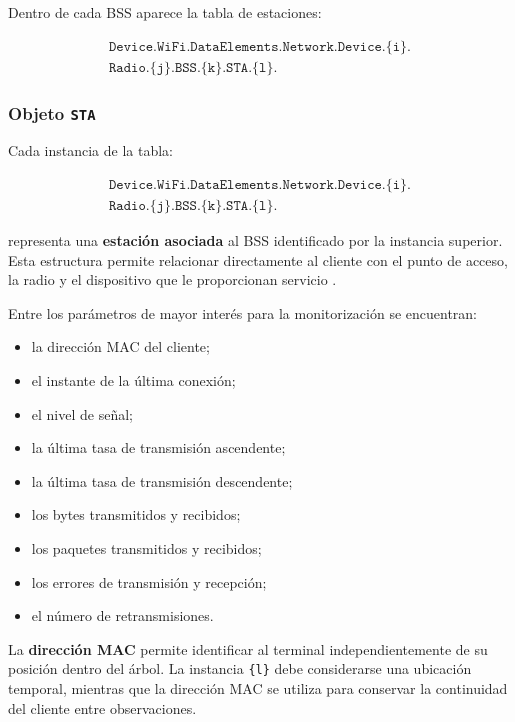 Dentro de cada BSS aparece la tabla de estaciones:

\[
\begin{split}
    \texttt{Device.WiFi.DataElements.Network.Device.\{i\}.}\\
    \texttt{Radio.\{j\}.BSS.\{k\}.STA.\{l\}.}
\end{split}
\]


\subsubsection*{Objeto \texttt{STA}}

Cada instancia de la tabla:

\[
\begin{split}
    \texttt{Device.WiFi.DataElements.Network.Device.\{i\}.}\\
    \texttt{Radio.\{j\}.BSS.\{k\}.STA.\{l\}.}
\end{split}
\]

representa una \textbf{estación asociada} al BSS identificado por la
instancia superior. Esta estructura permite relacionar directamente al
cliente con el punto de acceso, la radio y el dispositivo que le
proporcionan servicio \cite{bbf_tr181}.

Entre los parámetros de mayor interés para la monitorización se
encuentran:

\begin{itemize}
    \item la dirección MAC del cliente;
    \item el instante de la última conexión;
    \item el nivel de señal;
    \item la última tasa de transmisión ascendente;
    \item la última tasa de transmisión descendente;
    \item los bytes transmitidos y recibidos;
    \item los paquetes transmitidos y recibidos;
    \item los errores de transmisión y recepción;
    \item el número de retransmisiones.
\end{itemize}

La \textbf{dirección MAC} permite identificar al terminal
independientemente de su posición dentro del árbol. La instancia
\texttt{\{l\}} debe considerarse una ubicación temporal, mientras que la
dirección MAC se utiliza para conservar la continuidad del cliente entre
observaciones.

